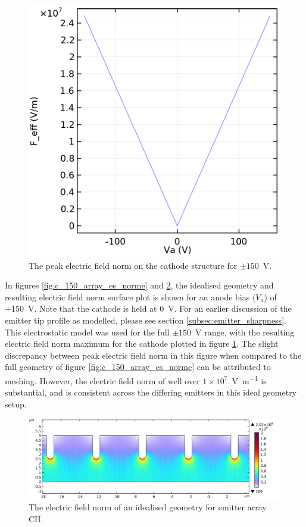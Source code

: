 \begin{refsection}
\begin{figure}[H]
    \centering
    \includegraphics[width=0.5\linewidth]{Chapter7/Figs/Raster/Comsol/array_es_full.png}
    \caption{The peak electric field norm on the cathode structure for $\pm150$~\si{\volt}.}
    \label{fig:c_array_es_full}
\end{figure}

In figures \ref{fig:c_150_array_es_norme} and \ref{fig:c_array_closer}, the idealised geometry and resulting electric field norm surface plot is shown for an anode bias ($V_{a}$) of +150~\si{\volt}. Note that the cathode is held at 0~\si{\volt}. For an earlier discussion of the emitter tip profile as modelled, please see section \ref{subsec:emitter_sharpness}. This electrostatic model was used for the full $\pm150$~\si{\volt} range, with the resulting electric field norm maximum for the cathode plotted in figure \ref{fig:c_array_es_full}. The slight discrepancy between peak electric field norm in this figure when compared to the full geometry of figure \ref{fig:c_150_array_es_norme} can be attributed to meshing. However, the electric field norm of well over $1\times10^{7}$~\si{\volt\per\metre} is substantial, and is consistent across the differing emitters in this ideal geometry setup.

\begin{figure}[H]
    \centering
    \includegraphics[width=\linewidth]{Chapter7/Figs/Raster/array_closer_es.jpg}
    \caption{The electric field norm of an idealised geometry for emitter array CH.}
    \label{fig:c_array_closer}
\end{figure}


\end{refsection}
